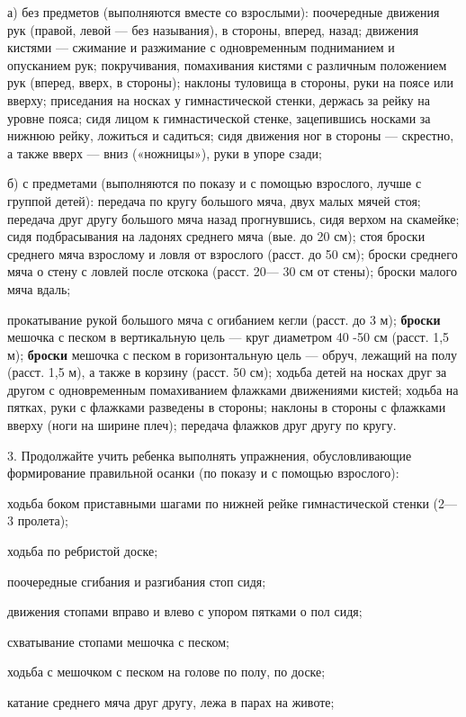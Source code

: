 \documentclass{book}
\begin{document}
а) без предметов (выполняются вместе со взрослыми): поочередные движения
рук (правой, левой --- без называния), в стороны, вперед, назад;
движения кистями --- сжимание и разжимание с одновременным подниманием и
опусканием рук; покручивания, помахивания кистями с различным положением
рук (вперед, вверх, в стороны); наклоны туловища в стороны, руки на
поясе или вверху; приседания на носках у гимнастической стенки, держась
за рейку на уровне пояса; сидя лицом к гимнастической стенке,
зацепившись носками за нижнюю рейку, ложиться и садиться; сидя движения
ног в стороны --- скрестно, а также вверх --- вниз («ножницы»), руки в
упоре сзади;

б) с предметами (выполняются по показу и с помощью взрослого, лучше с
группой детей): передача по кругу большого мяча, двух малых мячей стоя;
передача друг другу большого мяча назад прогнувшись, сидя верхом на
скамейке; сидя подбрасывания на ладонях среднего мяча (вые. до 20 см);
стоя броски среднего мяча взрослому и ловля от взрослого (расст. до 50
см); броски среднего мяча о стену с ловлей после отскока (расст. 20---
30 см от стены); броски малого мяча вдаль;

прокатывание рукой большого мяча с огибанием кегли (расст. до 3 м);
\textbf{броски} мешочка с песком в вертикальную цель --- круг диаметром
40 -50 см (расст. 1,5 м); \textbf{броски} мешочка с песком в
горизонтальную цель --- обруч, лежащий на полу (расст. 1,5 м), а также в
корзину (расст. 50 см); ходьба детей на носках друг за другом с
одновременным помахиванием флажками движениями кистей; ходьба на пятках,
руки с флажками разведены в стороны; наклоны в стороны с флажками вверху
(ноги на ширине плеч); передача флажков друг другу по кругу.

3. Продолжайте учить ребенка выполнять упражнения, обусловливающие
формирование правильной осанки (по показу и с помощью взрослого):

ходьба боком приставными шагами по нижней рейке гимнастической стенки
(2---3 пролета);

ходьба по ребристой доске;

поочередные сгибания и разгибания стоп сидя;

движения стопами вправо и влево с упором пятками о пол сидя;

схватывание стопами мешочка с песком;

ходьба с мешочком с песком на голове по полу, по доске;

катание среднего мяча друг другу, лежа в парах на животе;
\end{document}
